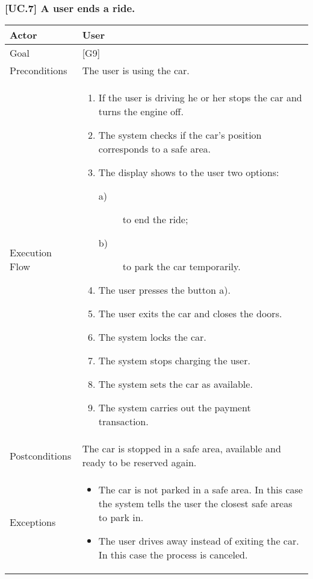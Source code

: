 \documentclass[english]{article}
\begin{document}
	\subsubsection{[UC.7] A user ends a ride.}
	\begin{tabularx}{\textwidth}{  l  X  }
		\hline
		Actor & User\\
		\hline
		Goal & [G9]\\
		\hline
		Preconditions & The user is using the car.\\
		\hline
		Execution Flow & \begin{enumerate}
			\item{If the user is driving he or her stops the car and turns the engine off.}
			\item{The system checks if the car's position corresponds to a safe area.}
			\item{The display shows to the user two options:
				\begin{description}
					\item[a)]{ to end the ride;}
					\item[b)]{ to park the car temporarily.}
				\end{description}}
				\item{The user presses the button a).}
				\item{The user exits the car and closes the doors.}
				\item{The system locks the car.}
				\item{The system stops charging the user.}
				\item{The system sets the car as available.}
				\item{The system carries out the payment transaction.}
			\end{enumerate}\\
			\hline
			Postconditions & The car is stopped in a safe area, available and ready to be reserved again.\\
			\hline
			Exceptions & \begin{itemize}
				\item{The car is not parked in a safe area. In this case the system tells the user the closest safe areas to park in.}
				\item{The user drives away instead of exiting the car. In this case the process is canceled.}
			\end{itemize}\\
			\hline
		\end{tabularx}
		
\end{document}
